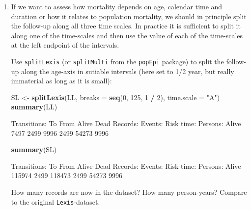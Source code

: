 \documentclass[
]{book}
\newenvironment{Shaded}{\begin{snugshade}}{\end{snugshade}}
\newcommand{\AttributeTok}[1]{\textcolor[rgb]{0.13,0.29,0.53}{#1}}
\newcommand{\DecValTok}[1]{\textcolor[rgb]{0.00,0.00,0.81}{#1}}
\newcommand{\FunctionTok}[1]{\textcolor[rgb]{0.13,0.29,0.53}{\textbf{#1}}}
\newcommand{\NormalTok}[1]{#1}
\newcommand{\OtherTok}[1]{\textcolor[rgb]{0.56,0.35,0.01}{#1}}
\newcommand{\SpecialCharTok}[1]{\textcolor[rgb]{0.81,0.36,0.00}{\textbf{#1}}}
\newcommand{\StringTok}[1]{\textcolor[rgb]{0.31,0.60,0.02}{#1}}
\begin{document}
\begin{enumerate}
\begin{Shaded}
\begin{Highlighting}[]

\NormalTok{sex     D     Y}
\NormalTok{  M  1343 27614}
\NormalTok{  F  1156 26659}
\end{Highlighting}
\end{Shaded}
\item
  If we want to assess how mortality depends on age, calendar time
  and duration or how it relates to population mortality, we should
  in principle split the follow-up along all
  three time scales. In practice it is sufficient to split it along
  one of the time-scales and then use the value of each of the
  time-scales at the left endpoint of the intervals.

  Use \texttt{splitLexis} (or \texttt{splitMulti} from the
  \texttt{popEpi} package) to split the follow-up along the
  age-axis in sutiable intervals (here set to 1/2 year, but really
  immaterial as long as it is small):

\begin{Shaded}
\begin{Highlighting}[]
\NormalTok{SL }\OtherTok{\textless{}{-}} \FunctionTok{splitLexis}\NormalTok{(LL,}
                 \AttributeTok{breaks =} \FunctionTok{seq}\NormalTok{(}\DecValTok{0}\NormalTok{, }\DecValTok{125}\NormalTok{, }\DecValTok{1} \SpecialCharTok{/} \DecValTok{2}\NormalTok{),}
             \AttributeTok{time.scale =} \StringTok{"A"}\NormalTok{)}
\FunctionTok{summary}\NormalTok{(LL)}
\end{Highlighting}
\end{Shaded}

\begin{Shaded}
\begin{Highlighting}[]

\NormalTok{Transitions:}
\NormalTok{     To}
\NormalTok{From    Alive Dead Records: Events: Risk time: Persons:}
\NormalTok{  Alive  7497 2499     9996    2499      54273     9996}
\end{Highlighting}
\end{Shaded}

\begin{Shaded}
\begin{Highlighting}[]
\FunctionTok{summary}\NormalTok{(SL)}
\end{Highlighting}
\end{Shaded}

\begin{Shaded}
\begin{Highlighting}[]

\NormalTok{Transitions:}
\NormalTok{     To}
\NormalTok{From     Alive Dead Records: Events: Risk time: Persons:}
\NormalTok{  Alive 115974 2499   118473    2499      54273     9996}
\end{Highlighting}
\end{Shaded}

  How many records are now in the dataset? How many person-years?
  Compare to the original \texttt{Lexis}-dataset.
\end{enumerate}
\end{document}
